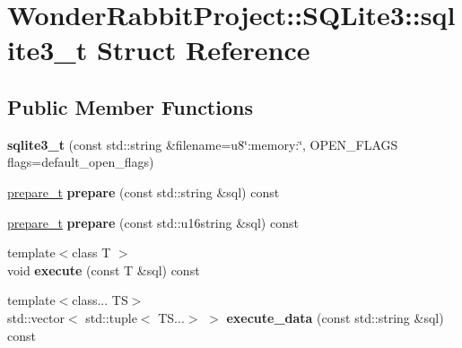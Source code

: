 \hypertarget{structWonderRabbitProject_1_1SQLite3_1_1sqlite3__t}{\section{Wonder\-Rabbit\-Project\-:\-:S\-Q\-Lite3\-:\-:sqlite3\-\_\-t Struct Reference}
\label{structWonderRabbitProject_1_1SQLite3_1_1sqlite3__t}
}
\subsection*{Public Member Functions}
\begin{DoxyCompactItemize}
\item 
\hypertarget{structWonderRabbitProject_1_1SQLite3_1_1sqlite3__t_a207d63cdead8470d3c4cc8dc7bd3741c}{{\bfseries sqlite3\-\_\-t} (const std\-::string \&filename=u8\char`\"{}\-:memory\-:\char`\"{}, O\-P\-E\-N\-\_\-\-F\-L\-A\-G\-S flags=default\-\_\-open\-\_\-flags)}\label{structWonderRabbitProject_1_1SQLite3_1_1sqlite3__t_a207d63cdead8470d3c4cc8dc7bd3741c}

\item 
\hypertarget{structWonderRabbitProject_1_1SQLite3_1_1sqlite3__t_a48293a0d6f5761b12f6c3461f44d50a7}{\hyperlink{structWonderRabbitProject_1_1SQLite3_1_1prepare__t}{prepare\-\_\-t} {\bfseries prepare} (const std\-::string \&sql) const }\label{structWonderRabbitProject_1_1SQLite3_1_1sqlite3__t_a48293a0d6f5761b12f6c3461f44d50a7}

\item 
\hypertarget{structWonderRabbitProject_1_1SQLite3_1_1sqlite3__t_a66a52fb4b6c1ff6af23c6d335db71489}{\hyperlink{structWonderRabbitProject_1_1SQLite3_1_1prepare__t}{prepare\-\_\-t} {\bfseries prepare} (const std\-::u16string \&sql) const }\label{structWonderRabbitProject_1_1SQLite3_1_1sqlite3__t_a66a52fb4b6c1ff6af23c6d335db71489}

\item 
\hypertarget{structWonderRabbitProject_1_1SQLite3_1_1sqlite3__t_a68801a4d2eed6d14c2475638caccf42a}{{\footnotesize template$<$class T $>$ }\\void {\bfseries execute} (const T \&sql) const }\label{structWonderRabbitProject_1_1SQLite3_1_1sqlite3__t_a68801a4d2eed6d14c2475638caccf42a}

\item 
\hypertarget{structWonderRabbitProject_1_1SQLite3_1_1sqlite3__t_aa24723c60ba3189cce1642bacaf52565}{{\footnotesize template$<$class... T\-S$>$ }\\std\-::vector$<$ std\-::tuple$<$ T\-S...$>$ $>$ {\bfseries execute\-\_\-data} (const std\-::string \&sql) const }\label{structWonderRabbitProject_1_1SQLite3_1_1sqlite3__t_aa24723c60ba3189cce1642bacaf52565}


\end{DoxyCompactItemize}
